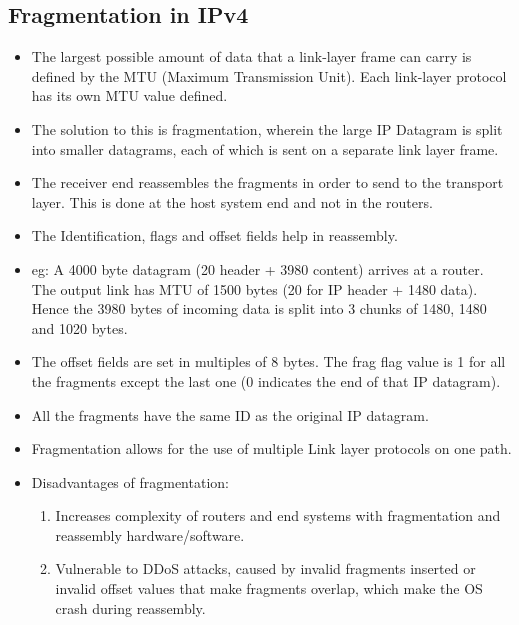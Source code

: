\documentclass[a4paper]{article}
\theoremstyle{plain}
\theoremstyle{definition}
\begin{document}
\subsection{Fragmentation in IPv4}
\begin{itemize}
    \item The largest possible amount of data that a link-layer frame can carry is defined by the MTU (Maximum Transmission Unit). Each link-layer protocol has its own MTU value defined. 
    
    \item The solution to this is fragmentation, wherein the large IP Datagram is split into smaller datagrams, each of which is sent on a separate link layer frame. 
    
    \item The receiver end reassembles the fragments in order to send to the transport layer. This is done at the host system end and not in the routers. 
    
    \item The Identification, flags and offset fields help in reassembly. 
    
    \item eg: A 4000 byte datagram (20 header + 3980 content) arrives at a router. The output link has MTU of 1500 bytes (20 for IP header + 1480 data). Hence the 3980 bytes of incoming data is split into 3 chunks of 1480, 1480 and 1020 bytes.
    
    \item The offset fields are set in multiples of 8 bytes. The frag flag value is 1 for all the fragments except the last one (0 indicates the end of that IP datagram). 
    
    \item All the fragments have the same ID as the original IP datagram. 
    
    \item Fragmentation allows for the use of multiple Link layer protocols on one path. 
    
    \item Disadvantages of fragmentation:
    \begin{enumerate}
        \item Increases complexity of routers and end systems with fragmentation and reassembly hardware/software.
        
        \item Vulnerable to DDoS attacks, caused by invalid fragments inserted or invalid offset values that make fragments overlap, which make the OS crash during reassembly. 
    \end{enumerate}
\end{itemize}
\end{document}
